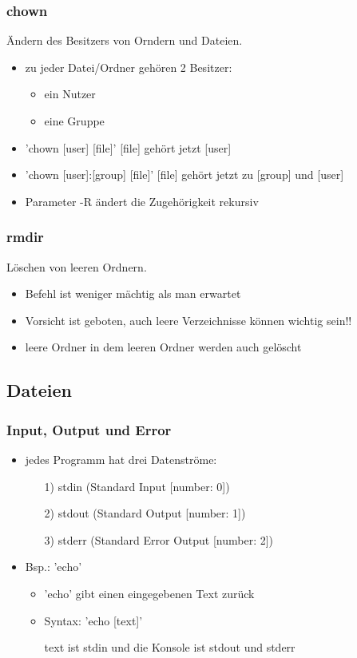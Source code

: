\documentclass[12pt,utf8]{beamer}
\begin{document}
\begin{frame}
\frametitle{chown}
Ändern des Besitzers von Orndern und Dateien.
\begin{itemize}
	\item zu jeder Datei/Ordner gehören 2 Besitzer:
	\begin{itemize}[<+->]
		\item ein Nutzer
		\item eine Gruppe
	\end{itemize}
	\item 'chown [user] [file]' [file] gehört jetzt [user]
	\item 'chown [user]:[group] [file]' [file] gehört jetzt zu [group] und [user]
	\item Parameter -R ändert die Zugehörigkeit rekursiv
\end{itemize}
\end{frame}

\begin{frame}
\frametitle{rmdir}
Löschen von leeren Ordnern.
\begin{itemize}
	\item Befehl ist weniger mächtig als man erwartet
	\item Vorsicht ist geboten, auch leere Verzeichnisse können wichtig sein!!
	\item leere Ordner in dem leeren Ordner werden auch gelöscht
\end{itemize}
\end{frame}

\subsection{Dateien}
\begin{frame}
\frametitle{Input, Output und Error}
\begin{itemize}
	\item jedes Programm hat drei Datenströme:
	\begin{itemize}
		\item[1)] stdin (Standard Input [number: 0])
		\item[2)] stdout (Standard Output [number: 1])
		\item[3)] stderr (Standard Error Output [number: 2])
	\end{itemize}
	\item Bsp.: 'echo'
	\begin{itemize}[<+->]
		\item 'echo' gibt einen eingegebenen Text zurück
		\item Syntax: 'echo [text]'
		\item [text] ist stdin und die Konsole ist stdout und stderr
	\end{itemize}
\end{itemize}
\end{frame}
\end{document}
